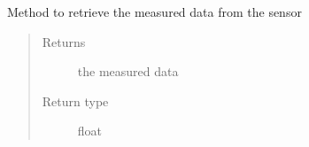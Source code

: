 \documentclass[letterpaper,10pt,english]{sphinxmanual}
\begin{document}
\begin{fulllineitems}
\begin{fulllineitems}
\label{\detokenize{sensor:lib.sensor.SensorInterface.read_measurements}}
Method to retrieve the measured data from the sensor
\begin{quote}\begin{description}
\item[{Returns}] \leavevmode
the measured data

\item[{Return type}] \leavevmode
float

\end{description}\end{quote}

\end{fulllineitems}


\end{fulllineitems}

\end{document}
